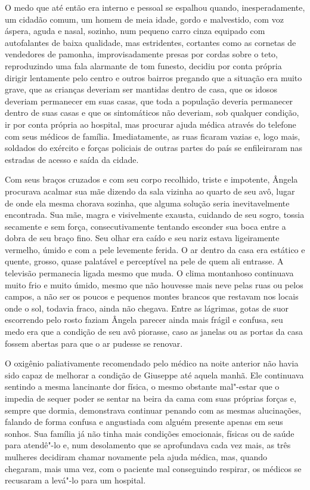 O medo que até então era interno e pessoal se espalhou quando,
inesperadamente, um cidadão comum, um homem de meia idade, gordo e
malvestido, com voz áspera, aguda e nasal, sozinho, num pequeno carro
cinza equipado com autofalantes de baixa qualidade, mas estridentes,
cortantes como as cornetas de vendedores de pamonha, improvisadamente
presas por cordas sobre o teto, reproduzindo uma fala alarmante de tom
funesto, decidiu por conta própria dirigir lentamente pelo centro e
outros bairros pregando que a situação era muito grave, que as crianças
deveriam ser mantidas dentro de casa, que os idosos deveriam permanecer
em suas casas, que toda a população deveria permanecer dentro de suas
casas e que os sintomáticos não deveriam, sob qualquer condição, ir por
conta própria ao hospital, mas procurar ajuda médica através do telefone
com seus médicos de família. Imediatamente, as ruas ficaram vazias e,
logo mais, soldados do exército e forças policiais de outras partes do
país se enfileiraram nas estradas de acesso e saída da cidade.

Com seus braços cruzados e com seu corpo recolhido, triste e impotente,
Ângela procurava acalmar sua mãe dizendo da sala vizinha ao quarto de
seu avô, lugar de onde ela mesma chorava sozinha, que alguma solução
seria inevitavelmente encontrada. Sua mãe, magra e visivelmente exausta,
cuidando de seu sogro, tossia secamente e sem força, consecutivamente
tentando esconder sua boca entre a dobra de seu braço fino. Seu olhar
era caído e seu nariz estava ligeiramente vermelho, úmido e com a pele
levemente ferida. O ar dentro da casa era estático e quente, grosso,
quase palatável e perceptível na pele de quem ali entrasse. A televisão
permanecia ligada mesmo que muda. O clima montanhoso continuava muito
frio e muito úmido, mesmo que não houvesse mais neve pelas ruas ou pelos
campos, a não ser os poucos e pequenos montes brancos que restavam nos
locais onde o sol, todavia fraco, ainda não chegava. Entre as lágrimas,
gotas de suor escorrendo pelo rosto faziam Ângela parecer ainda mais
frágil e confusa, seu medo era que a condição de seu avô piorasse, caso
as janelas ou as portas da casa fossem abertas para que o ar pudesse se
renovar.

O oxigênio paliativamente recomendado pelo médico na noite anterior não
havia sido capaz de melhorar a condição de Giuseppe até aquela manhã.
Ele continuava sentindo a mesma lancinante dor física, o mesmo obstante
mal"-estar que o impedia de sequer poder se sentar na beira da cama com
suas próprias forças e, sempre que dormia, demonstrava continuar penando
com as mesmas alucinações, falando de forma confusa e angustiada com
alguém presente apenas em seus sonhos. Sua família já não tinha mais
condições emocionais, físicas ou de saúde para atendê"-lo e, num
desolamento que se aprofundava cada vez mais, as três mulheres decidiram
chamar novamente pela ajuda médica, mas, quando chegaram, mais uma vez,
com o paciente mal conseguindo respirar, os médicos se recusaram a
levá"-lo para um hospital.

